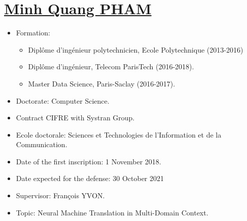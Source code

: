 \documentclass[11pt, letterpaper]{article}
\begin{document}
\setlength{\belowdisplayskip}{3pt} \setlength{\belowdisplayshortskip}{3pt}
\setlength{\abovedisplayskip}{3pt} \setlength{\abovedisplayshortskip}{3pt}
\setlength{\parskip}{0.1cm}
\setlength{\parindent}{1em}
\section*{\underline{Minh Quang PHAM}}
\begin{itemize}
	\item Formation: 
		\begin{itemize}
			\item Diplôme d'ingénieur polytechnicien, Ecole Polytechnique (2013-2016)
			\item Diplôme d'ingénieur, Telecom ParisTech (2016-2018).
			\item Master Data Science, Paris-Saclay (2016-2017).
		\end{itemize}  
	\item Doctorate: Computer Science.
	\item Contract CIFRE  with Systran Group.
	\item Ecole doctorale: Sciences et Technologies de l'Information et de la Communication.
	\item Date of the first inscription: 1 November 2018.
	\item Date expected for the defense: 30 October 2021
	\item Supervisor: François YVON.
	\item Topic: Neural Machine Translation in Multi-Domain Context.
\end{itemize}
\end{document}
